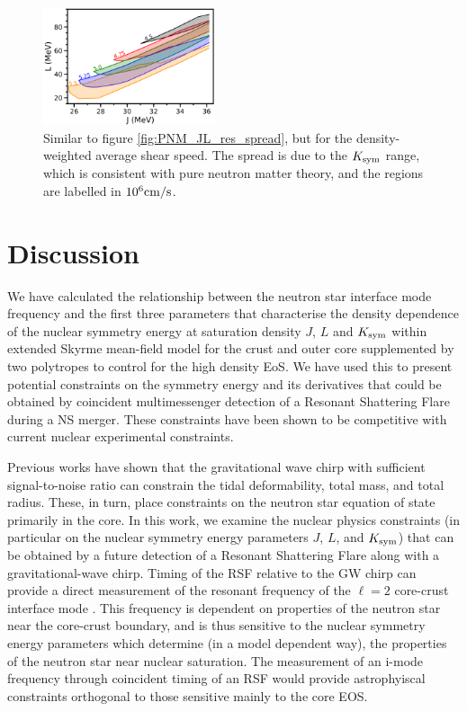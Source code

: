 \documentclass[fleqn,usenatbib]{mnras}
\begin{document}
\begin{figure}
\centering
\includegraphics[width=0.45\textwidth,angle=0]{PNM_avct_JL_Kspread.png}
\caption{Similar to figure \ref{fig:PNM_JL_res_spread}, but for the density-weighted average shear speed. The spread is due to the $K_{\rm sym}$ range, which is consistent with pure neutron matter theory, and the regions are labelled in $10^6 \rm{cm/s}$.}
\label{fig:avct_JL_PNM}
\end{figure}



\section{Discussion}
\hspace{\parindent}We have calculated the relationship between the neutron star interface mode frequency and the first three parameters that characterise the density dependence of the nuclear symmetry energy at saturation density $J$, $L$ and $K_{\rm sym}$ within extended Skyrme mean-field model for the crust and outer core supplemented by two polytropes to control for the high density EoS. We have used this to present potential constraints on the symmetry energy and its derivatives that could be obtained by coincident multimessenger detection of a Resonant Shattering Flare during a NS merger. These constraints have been shown to be competitive with current nuclear experimental constraints.

Previous works have shown \citep{abbott2017gw170817,de2018tidal,abbott2018gw170817} that the gravitational wave chirp with sufficient signal-to-noise ratio can constrain the tidal deformability, total mass, and total radius. These, in turn, place constraints on the neutron star equation of state \citep{annala2018gravitational,lim2018neutron} primarily in the core. In this work, we examine the nuclear physics constraints (in particular on the nuclear symmetry energy parameters $J$, $L$, and $K_{\rm sym}$) that can be obtained by a future detection of a Resonant Shattering Flare along with a gravitational-wave chirp. Timing of the RSF relative to the GW chirp can provide a direct measurement of the resonant frequency of the $\ell = 2$ core-crust interface mode  \citep{tsang2012resonant}. This frequency is dependent on properties of the neutron star near the core-crust boundary, and is thus sensitive to the nuclear symmetry energy parameters which determine (in a model dependent way), the properties of the neutron star near nuclear saturation. The measurement of an i-mode frequency through coincident timing of an RSF would provide astrophyiscal constraints orthogonal to those sensitive mainly to the core EOS. 
\end{document}
